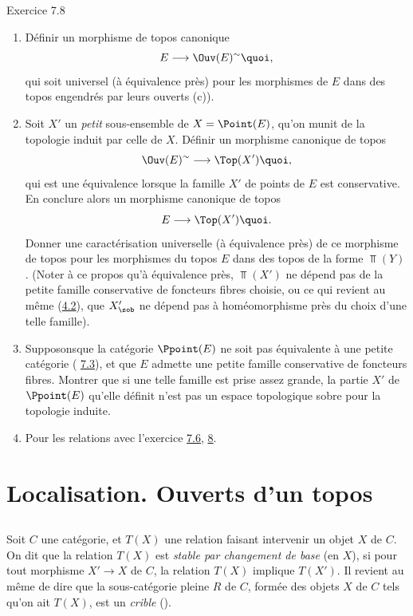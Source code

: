 \documentclass[10pt]{../fichiers-configuration-latex/smfart}
\begin{document}
\begin{enonce*}[remark]{Exercice 7.8}
\begin{enumerate}
\item Définir un morphisme de topos canonique
$$
E\longrightarrow \Ouv(E)^{\sim}{\quoi},
$$
qui soit universel (à équivalence près) pour les morphismes de $E$
dans des topos engendrés par leurs ouverts (\cf c)).

\item Soit $X'$ un \emph{petit} sous-ensemble de $X=\Point(E)$, qu'on
munit de la topologie induit par celle de $X$. Définir un morphisme
canonique de topos
$$
\Ouv(E)^{\sim}\longrightarrow \Top(X'){\quoi},
$$
qui est une équivalence lorsque la famille $X'$ de points de $E$ est
conservative. En conclure alors un morphisme canonique de topos
$$
E\longrightarrow \Top(X'){\quoi}.
$$
Donner une caractérisation universelle (à équivalence près) de ce
morphisme de topos pour les morphismes du topos $E$ dans des topos
de la forme $\Top(Y)$. (Noter à ce propos qu'à équivalence près,
$\Top(X')$ ne dépend pas de la petite famille conservative de
foncteurs fibres choisie, ou ce qui revient au même
(\hyperref[IV.subsec4.2]{4.2}), que $X'_{\sob}$ ne dépend pas à homéomorphisme
près du choix d'une telle famille).

\item Supposons\pageoriginale que la catégorie $\Ppoint(E)$ ne
soit pas équivalente à une petite catégorie (\cf
\hyperref[IV.subsec7.3]{7.3}), et que $E$ admette une petite famille
conservative de foncteurs fibres. Montrer que si une telle famille
est prise assez grande, la partie $X'$ de $\Ppoint(E)$ qu'elle
définit n'est pas un espace topologique sobre pour la topologie
induite.

\item Pour les relations avec l'exercice \hyperref[IV.exer7.6]{7.6}, \cf \hyperref[IV.sec8]{8}.
\end{enumerate}
\end{enonce*}

\section{Localisation. Ouverts d'un topos}

\subsection{}
Soit $C$ une catégorie, et $T(X)$ une relation faisant intervenir un
objet $X$ de $C$. On dit que la relation $T(X)$ est \emph{stable par
changement de base} (en $X$), si pour tout morphisme $X'\rightarrow
X$ de $C$, la relation $T(X)$ implique $T(X')$. Il revient au même
de dire que la sous-catégorie pleine $R$ de $C$, formée des objets
$X$ de $C$ tels qu'on ait $T(X)$, est un \emph{crible}
().
\end{document}

